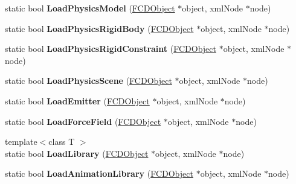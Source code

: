 \begin{DoxyCompactItemize}
\item 
\hypertarget{classFArchiveXML_a04cb9c9989157dc2567e75be5470aca0}{
static bool {\bfseries LoadPhysicsModel} (\hyperlink{classFCDObject}{FCDObject} $\ast$object, xmlNode $\ast$node)}
\label{classFArchiveXML_a04cb9c9989157dc2567e75be5470aca0}

\item 
\hypertarget{classFArchiveXML_ac3a5fcb3474dfb503c68cd9387abe180}{
static bool {\bfseries LoadPhysicsRigidBody} (\hyperlink{classFCDObject}{FCDObject} $\ast$object, xmlNode $\ast$node)}
\label{classFArchiveXML_ac3a5fcb3474dfb503c68cd9387abe180}

\item 
\hypertarget{classFArchiveXML_a0512e8df437af58424e0bf64abcee55d}{
static bool {\bfseries LoadPhysicsRigidConstraint} (\hyperlink{classFCDObject}{FCDObject} $\ast$object, xmlNode $\ast$node)}
\label{classFArchiveXML_a0512e8df437af58424e0bf64abcee55d}

\item 
\hypertarget{classFArchiveXML_ae7dd322663acecf932d959b69af4e00d}{
static bool {\bfseries LoadPhysicsScene} (\hyperlink{classFCDObject}{FCDObject} $\ast$object, xmlNode $\ast$node)}
\label{classFArchiveXML_ae7dd322663acecf932d959b69af4e00d}

\item 
\hypertarget{classFArchiveXML_a24ce1334527d99a8d177d7596548a234}{
static bool {\bfseries LoadEmitter} (\hyperlink{classFCDObject}{FCDObject} $\ast$object, xmlNode $\ast$node)}
\label{classFArchiveXML_a24ce1334527d99a8d177d7596548a234}

\item 
\hypertarget{classFArchiveXML_a634d59668009bd2fda13656b90304993}{
static bool {\bfseries LoadForceField} (\hyperlink{classFCDObject}{FCDObject} $\ast$object, xmlNode $\ast$node)}
\label{classFArchiveXML_a634d59668009bd2fda13656b90304993}

\item 
\hypertarget{classFArchiveXML_a393c060981bea9bebcd033c86428c246}{
{\footnotesize template$<$class T $>$ }\\static bool {\bfseries LoadLibrary} (\hyperlink{classFCDObject}{FCDObject} $\ast$object, xmlNode $\ast$node)}
\label{classFArchiveXML_a393c060981bea9bebcd033c86428c246}

\item 
\hypertarget{classFArchiveXML_a1aa5d6c15add9802dbcd4f5d8444b546}{
static bool {\bfseries LoadAnimationLibrary} (\hyperlink{classFCDObject}{FCDObject} $\ast$object, xmlNode $\ast$node)}
\label{classFArchiveXML_a1aa5d6c15add9802dbcd4f5d8444b546}


\end{DoxyCompactItemize}
